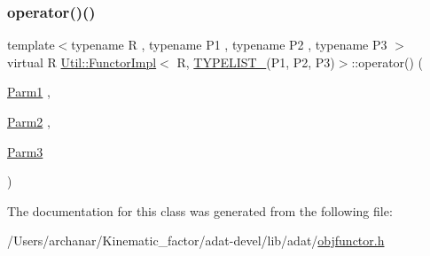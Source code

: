 \mbox{\label{classUtil_1_1FunctorImpl_3_01R_00_01TYPELIST__3_07P1_00_01P2_00_01P3_08_4_a80ceaa256d42f98c4523dea840906200}} 
\subsubsection{\texorpdfstring{operator()()}{operator()()}\hspace{0.1cm}{\footnotesize\ttfamily [3/3]}}
{\footnotesize\ttfamily template$<$typename R , typename P1 , typename P2 , typename P3 $>$ \\
virtual R \mbox{\hyperlink{classUtil_1_1FunctorImpl}{Util\+::\+Functor\+Impl}}$<$ R, \mbox{\hyperlink{adat__devel__install_2include_2adat_2typelist_8h_a0309f68a543c5c0994f9edc0e56dc59f}{T\+Y\+P\+E\+L\+I\+S\+T\+\_}}(P1, P2, P3)$>$\+::operator() (\begin{DoxyParamCaption}\item[{\mbox{\hyperlink{structUtil_1_1Private_1_1FunctorImplBase_a9d61e693d6c616dea5bd9d9073c7d21a}{Parm1}}}]{,  }\item[{\mbox{\hyperlink{structUtil_1_1Private_1_1FunctorImplBase_a554085cd798ef14838a59b528f0feb2e}{Parm2}}}]{,  }\item[{\mbox{\hyperlink{structUtil_1_1Private_1_1FunctorImplBase_a052148e627fd4caecbcffdbdf1033dbb}{Parm3}}}]{ }\end{DoxyParamCaption})\hspace{0.3cm}{\ttfamily [pure virtual]}}



The documentation for this class was generated from the following file\+:\begin{DoxyCompactItemize}
\item 
/\+Users/archanar/\+Kinematic\+\_\+factor/adat-\/devel/lib/adat/\mbox{\hyperlink{adat-devel_2lib_2adat_2objfunctor_8h}{objfunctor.\+h}}\end{DoxyCompactItemize}
